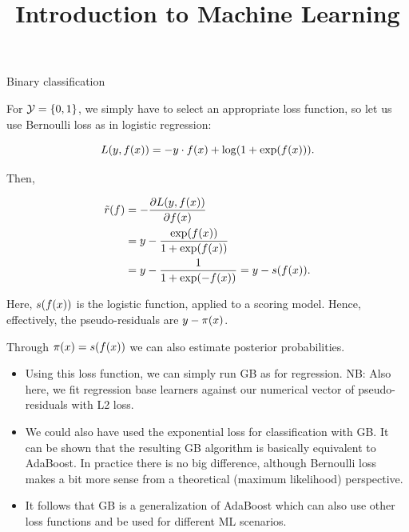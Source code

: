  






\newcommand{\titlefigure}{figure/boosting_classif_title.png}
\newcommand{\learninggoals}{
  \item Transerfing gradient boosting for regression to binary classification problems
  \item Introducing gradient boosting for multiclass problems
}

\title{Introduction to Machine Learning}
\date{}





\begin{vbframe}{Binary classification}


For $\mathcal{Y} = \{0, 1\}$, we simply have to select an appropriate loss function, so let us
use Bernoulli loss as in logistic regression:

$$ L(y, f(x)) = - y \cdot f(x) + \log(1 + \exp(f(x))).$$

Then,

\vspace{-0.5cm}

\begin{align*}
\tilde{r}(f) &=-\frac{\partial L(y, f(x))}{\partial f(x)} \\
&= y - \frac{\exp(f(x))}{1 + \exp(f(x))} \\
&= y - \frac{1}{1 + \exp(-f(x))} = y - s(f(x)).
\end{align*}

Here, $s(f(x))$ is the logistic function, applied to a scoring model.
Hence, effectively, the pseudo-residuals are $y - \pi(x)$.

Through $\pi(x) = s(f(x))$ we can also estimate posterior probabilities.

\framebreak
%

\begin{itemize}
\item Using this loss function, we can simply run GB as for regression.
  NB: Also here, we fit regression base learners against our numerical 
  vector of pseudo-residuals with L2 loss. 
\item  We could also have used the exponential loss for classification with 
  GB. It can be shown that the resulting GB algorithm is basically equivalent 
    to AdaBoost. In practice there is no big difference, although Bernoulli loss 
    makes a bit more sense from a theoretical (maximum likelihood) perspective.
\item It follows that GB is a generalization of AdaBoost which can also use other loss functions and be used for different ML scenarios.
\end{itemize}


\end{vbframe}

